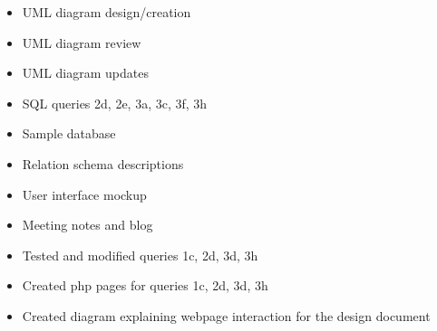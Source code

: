 \begin{itemize}
	\item UML diagram design/creation
	\item UML diagram review
	\item UML diagram updates
	\item SQL queries 2d, 2e, 3a, 3c, 3f, 3h
	\item Sample database
	\item Relation schema descriptions
	\item User interface mockup
	\item Meeting notes and blog
	\item Tested and modified queries 1c, 2d, 3d, 3h
	\item Created php pages for queries 1c, 2d, 3d, 3h
	\item Created diagram explaining webpage interaction for the design document

\end{itemize}